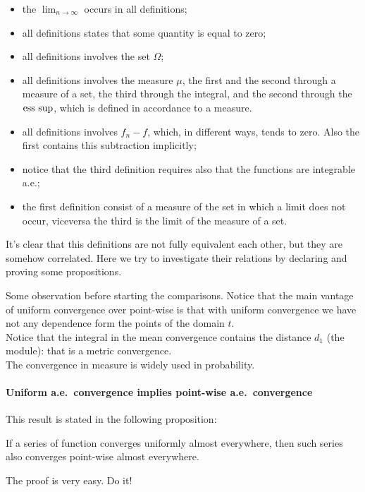 \begin{itemize}
	\item the $\lim_{n \to \infty}$ occurs in all definitions;
	\item all definitions states that some quantity is equal to zero;
	\item all definitions involves the set $\Omega$;
	\item all definitions involves the measure $\mu$, the first and the second through a measure of a set, the third through the integral, and the second through the $\operatorname*{ess\ sup}$, which is defined in accordance to a measure.
	\item all definitions involves $f_n - f$, which, in different ways, tends to zero. Also the first contains this subtraction implicitly;
	\item notice that the third definition requires also that the functions are integrable a.e.;
	\item the first definition consist of a measure of the set in which a limit does not occur, viceversa the third is the limit of the measure of a set.
\end{itemize}

It's clear that this definitions are not fully equivalent each other, but they are somehow correlated. Here we try to investigate their relations by declaring and proving some propositions.

Some observation before starting the comparisons. Notice that the main vantage of uniform convergence over point-wise is that with uniform convergence we have not any dependence form the points of the domain $t$.\\ 
Notice that the integral in the mean convergence contains the distance $d_1$ (the module): that is a metric convergence.\\
The convergence in measure is widely used in probability.

\paragraph{Uniform a.e.\ convergence implies point-wise a.e.\ convergence} This result is stated in the following proposition:
\begin{prop}\label{convergence-uniform-implies-point-wise}
	If a series of function converges uniformly almost everywhere, then such series also converges point-wise almost everywhere.
\end{prop}
The proof is very easy. Do it!\\

